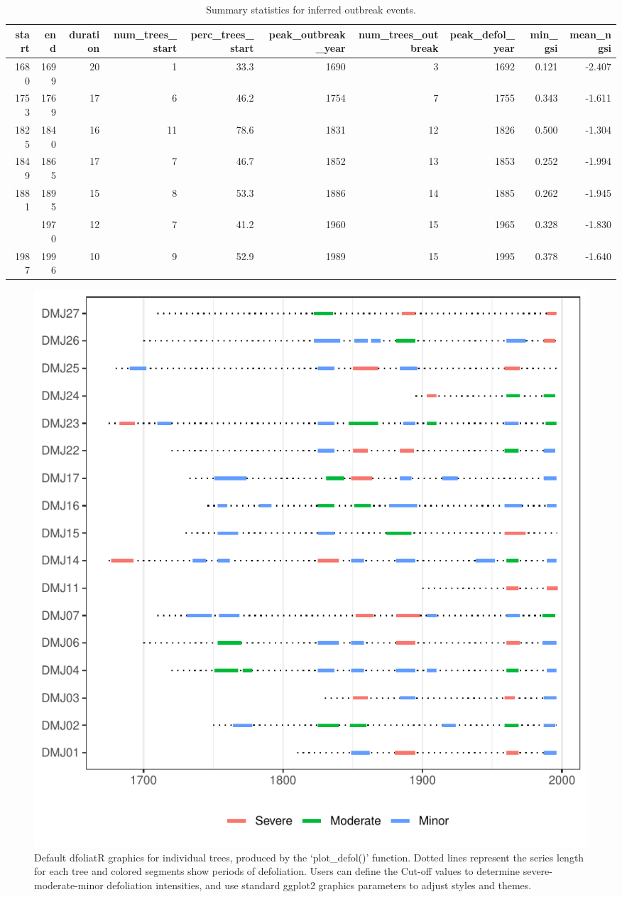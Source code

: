\documentclass[review]{elsarticle} %
\makeatletter
\def\maxwidth{\ifdim\Gin@nat@width>\linewidth\linewidth
\else\Gin@nat@width\fi}
\let\Oldincludegraphics\includegraphics
\renewcommand{\includegraphics}[1]{\Oldincludegraphics[width=\maxwidth]{#1}}
\makeatother
\begin{document}
\begin{landscape}\begin{table}

\caption{\label{tab:tbl-obr}Summary statistics for inferred outbreak events.}
\centering
\fontsize{7}{9}\selectfont
\begin{tabular}[t]{rrrrrrrrrr}
\toprule
start & end & duration & num\_trees\_start & perc\_trees\_start & peak\_outbreak\_year & num\_trees\_outbreak & peak\_defol\_year & min\_gsi & mean\_ngsi\\
\midrule
1680 & 1699 & 20 & 1 & 33.3 & 1690 & 3 & 1692 & 0.121 & -2.407\\
1753 & 1769 & 17 & 6 & 46.2 & 1754 & 7 & 1755 & 0.343 & -1.611\\
1825 & 1840 & 16 & 11 & 78.6 & 1831 & 12 & 1826 & 0.500 & -1.304\\
1849 & 1865 & 17 & 7 & 46.7 & 1852 & 13 & 1853 & 0.252 & -1.994\\
1881 & 1895 & 15 & 8 & 53.3 & 1886 & 14 & 1885 & 0.262 & -1.945\\
\addlinespace
1959 & 1970 & 12 & 7 & 41.2 & 1960 & 15 & 1965 & 0.328 & -1.830\\
1987 & 1996 & 10 & 9 & 52.9 & 1989 & 15 & 1995 & 0.378 & -1.640\\
\bottomrule
\end{tabular}
\end{table}
\end{landscape}

\begin{figure}
\centering
\includegraphics{../paper_elsevier/Output/tree-plot-default.pdf}
\caption{\label{fig:fig-defol}Default dfoliatR graphics for individual trees, produced by the `plot\_defol()' function. Dotted lines represent the series length for each tree and colored segments show periods of defoliation. Users can define the Cut-off values to determine severe-moderate-minor defoliation intensities, and use standard ggplot2 graphics parameters to adjust styles and themes.}
\end{figure}
\end{document}
